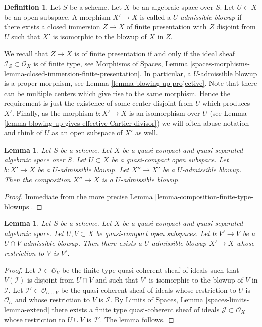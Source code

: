 \documentclass{stacks-project}
\theoremstyle{plain}
\newtheorem{lemma}[subsection]{Lemma}
\theoremstyle{definition}
\newtheorem{definition}[subsection]{Definition}
\theoremstyle{remark}
\numberwithin{equation}{subsection}
\begin{document}
\begin{definition}
\label{definition-admissible-blowup}
Let $S$ be a scheme. Let $X$ be an algebraic space over $S$.
Let $U \subset X$ be an open subspace. A morphism
$X' \to X$ is called a {\it $U$-admissible blowup} if there exists a
closed immersion $Z \to X$ of finite presentation with $Z$ disjoint from
$U$ such that $X'$ is isomorphic to the blowup of $X$ in $Z$.
\end{definition}

\noindent
We recall that $Z \to X$ is of finite presentation if and only if the
ideal sheaf $\mathcal{I}_Z \subset \mathcal{O}_X$ is of finite type, see
Morphisms of Spaces, Lemma
\ref{spaces-morphisms-lemma-closed-immersion-finite-presentation}.
In particular, a $U$-admissible blowup is a proper morphism, see
Lemma \ref{lemma-blowing-up-projective}.
Note that there can be multiple centers which give rise to the same morphism.
Hence the requirement is just the existence of some center disjoint from
$U$ which produces $X'$.
Finally, as the morphism $b : X' \to X$ is an isomorphism over $U$ (see
Lemma \ref{lemma-blowing-up-gives-effective-Cartier-divisor}) we will often
abuse notation and think of $U$ as an open subspace of $X'$ as well.

\begin{lemma}
\label{lemma-composition-admissible-blowups}
Let $S$ be a scheme.
Let $X$ be a quasi-compact and quasi-separated algebraic space over $S$.
Let $U \subset X$ be a quasi-compact open subspace.
Let $b : X' \to X$ be a $U$-admissible blowup.
Let $X'' \to X'$ be a $U$-admissible blowup.
Then the composition $X'' \to X$ is a $U$-admissible blowup.
\end{lemma}

\begin{proof}
Immediate from the more precise
Lemma \ref{lemma-composition-finite-type-blowups}.
\end{proof}

\begin{lemma}
\label{lemma-extend-admissible-blowups}
Let $S$ be a scheme.
Let $X$ be a quasi-compact and quasi-separated algebraic space.
Let $U, V \subset X$ be quasi-compact open subspaces.
Let $b : V' \to V$ be a $U \cap V$-admissible blowup.
Then there exists a $U$-admissible blowup $X' \to X$
whose restriction to $V$ is $V'$.
\end{lemma}

\begin{proof}
Let $\mathcal{I} \subset \mathcal{O}_V$ be the finite type
quasi-coherent sheaf of ideals such that $V(\mathcal{I})$ is
disjoint from $U \cap V$ and such that $V'$ is isomorphic to the
blowup of $V$ in $\mathcal{I}$. Let
$\mathcal{I}' \subset \mathcal{O}_{U \cup V}$ be the quasi-coherent
sheaf of ideals whose restriction to $U$ is $\mathcal{O}_U$ and
whose restriction to $V$ is $\mathcal{I}$.
By Limits of Spaces, Lemma \ref{spaces-limits-lemma-extend}
there exists a finite type quasi-coherent sheaf of ideals
$\mathcal{J} \subset \mathcal{O}_X$ whose restriction to $U \cup V$ is
$\mathcal{I}'$. The lemma follows.
\end{proof}
\end{document}
